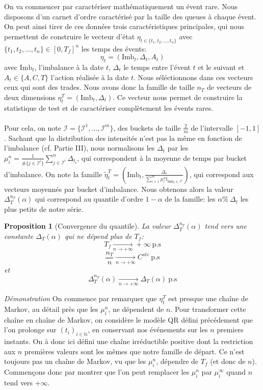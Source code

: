 \documentclass[12pt,a4paper]{article}
\newtheorem{proposition}[theorem]{Proposition}
\theoremstyle{definition}
\theoremstyle{remark}
\begin{document}
On va commencer par caractériser mathématiquement un évent rare. Nous disposons d'un carnet d'ordre caractérisé par la taille des queues à chaque évent. On peut ainsi tirer de ces données trois caractéristiques principales, qui nous permettent de construire le vecteur d'état $\eta_{t\in \{t_1,t_2,\dots,t_n\}}$ avec $\{t_1,t_2,\dots,t_n\}\in [0,T_f]^n$ les temps des évents:
$$\eta_t = (\text{Imb}_t, \Delta_t, {A_t})$$
avec $\text{Imb}_t$, l'imbalance à la date $t$, $\Delta_t$ le temps entre l'évent $t$ et le suivant et $A_t\in \{A,C,T\}$ l'action réalisée à la date $t$. Nous séléctionnons dans ces vecteurs ceux qui sont des trades. Nous avons donc la famille de taille $n_T$ de vecteurs de deux dimensions $\eta_t^T = (\text{Imb}_t, \Delta_t)$.
Ce vecteur nous permet de construire la statistique de test et de caractériser complètement les évents rares.
\\
\\
Pour cela, on note $\mathcal I= \{\mathcal I^1,\dots,\mathcal I^m\}$, des buckets de taille $\frac{2}{m}$ de l'intervalle $[-1,1]$. Sachant que la distribution des intensités n'est pas la même en fonction de l'imbalance (cf. Partie III), nous normalisons les $\Delta_t$ par les $\mu_i^n = \frac{1}{\#\{j\in \mathcal I^i\}}\sum_{j\in \mathcal I^i}^n\Delta_{t_i}$, qui correspondent à la moyenne de temps par bucket d'imbalance.
On note la famille $\tilde \eta_t^T = \left(\text{Imb}_t, \frac{\Delta_t}{\sum_{i=1}^m\mu_i^n\mathbb{I}_{\text{Imb}_t\in\mathcal{I}^{i}}}\right)$, qui correspond aux vecteurs moyennés par bucket d'imbalance.
Nous obtenons alors la valeur $\Delta_T^{n_T}(\alpha)$ qui correspond au quantile d'ordre $1-\alpha$ de la famille: les $\alpha\% \ \Delta_t$ les plus petits de notre série.
\begin{proposition}[Convergence du quantile]
La valeur $\Delta_T^{n_T}(\alpha)$ tend vers une constante $\Delta_T(\alpha)$ qui ne dépend plus de $T_f$:
$$T_f\underset{n\to +\infty}{\to}+\infty \ \text{p.s}$$
$$\frac{n_T}{n}\underset{n\to +\infty}{\to}C^{ste} \ \text{p.s}$$
et
$$\Delta_T^{n_T}(\alpha)\underset{n\to +\infty}{\to}\Delta_T(\alpha) \ \text{p.s}$$
\end{proposition}
\textit{Démonstration}
On commence par remarquer que $\eta_t^T$ est presque une chaîne de Markov, au détail près que les $\mu_i^n$, ne dépendent de 
$n$.  Pour transformer cette chaîne en chaîne de Markov, on considère le modèle QR défini précédement que l'on prolonge sur $(t_i)_{i\in\mathbb{N}}$, en conservant nos événements sur les $n$ premiers instants. On à donc ici défini une chaîne irréductible positive dont la restriction aux $n$ premières valeurs sont les mêmes que notre famille de départ. Ce n'est toujours pas un chaîne de Markov, vu que les $\mu_i^n$, dépendre de $T_f$ (et donc de $n$). Commençons donc par montrer que l'on peut remplacer les $\mu_i^n$ par $\mu_i^{\infty}$ quand $n$ tend vers $+\infty$.
\end{document}
